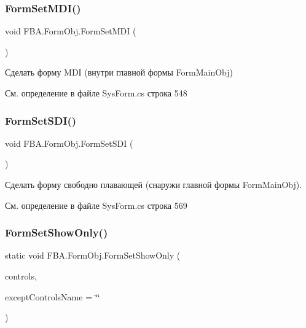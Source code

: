 \subsubsection{\texorpdfstring{Form\+Set\+M\+D\+I()}{FormSetMDI()}}
{\footnotesize\ttfamily void F\+B\+A.\+Form\+Obj.\+Form\+Set\+M\+DI (\begin{DoxyParamCaption}{ }\end{DoxyParamCaption})}



Сделать форму M\+DI (внутри главной формы Form\+Main\+Obj) 



См. определение в файле Sys\+Form.\+cs строка 548

\mbox{\label{class_f_b_a_1_1_form_obj_a2c0349e279cc5fffde623381db8eb064}} 
\subsubsection{\texorpdfstring{Form\+Set\+S\+D\+I()}{FormSetSDI()}}
{\footnotesize\ttfamily void F\+B\+A.\+Form\+Obj.\+Form\+Set\+S\+DI (\begin{DoxyParamCaption}{ }\end{DoxyParamCaption})}



Сделать форму свободно плавающей (снаружи главной формы Form\+Main\+Obj). 



См. определение в файле Sys\+Form.\+cs строка 569

\mbox{\label{class_f_b_a_1_1_form_obj_a3aa92458d9f312e35e965d9a7ff7d4a5}} 
\subsubsection{\texorpdfstring{Form\+Set\+Show\+Only()}{FormSetShowOnly()}}
{\footnotesize\ttfamily static void F\+B\+A.\+Form\+Obj.\+Form\+Set\+Show\+Only (\begin{DoxyParamCaption}\item[{Control.\+Control\+Collection}]{controls,  }\item[{string}]{except\+Controls\+Name = {\ttfamily \char`\"{}\char`\"{}} }\end{DoxyParamCaption})\hspace{0.3cm}{\ttfamily [static]}}

